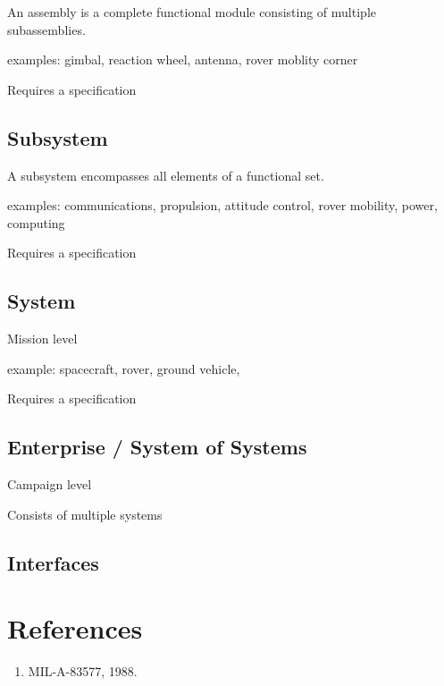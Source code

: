 \documentclass[12pt]{article}
\begin{document}
An assembly is a complete functional module consisting of multiple subassemblies.

examples: gimbal, reaction wheel, antenna, rover moblity corner

Requires a specification

\subsection{Subsystem}

A subsystem encompasses all elements of a functional set.

examples: communications, propulsion, attitude control, rover mobility, power, computing

Requires a specification

\subsection{System}

Mission level

example: spacecraft, rover, ground vehicle, 

Requires a specification

\subsection{Enterprise / System of Systems}

Campaign level

Consists of multiple systems


\subsection{Interfaces}







\section*{References}

\begin{enumerate}
\item MIL-A-83577, 1988.
\end{enumerate}
\end{document}
